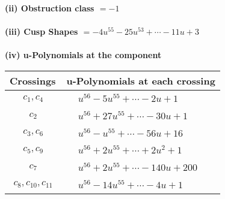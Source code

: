 \documentclass[1p]{elsarticle_modified}
\theoremstyle{definition}
\begin{document}
\flushleft \textbf{(ii) Obstruction class $= -1$}\\~\\
\flushleft \textbf{(iii) Cusp Shapes $= -4 u^{55}-25 u^{53}+\cdots-11 u+3$}\\~\\
\newpage\renewcommand{\arraystretch}{1}
\flushleft \textbf{(iv) u-Polynomials at the component}\newline \\
\begin{tabular}{m{50pt}|m{274pt}}
Crossings & \hspace{64pt}u-Polynomials at each crossing \\
\hline $$\begin{aligned}c_{1},c_{4}\end{aligned}$$&$\begin{aligned}
&u^{56}-5 u^{55}+\cdots-2 u+1
\end{aligned}$\\
\hline $$\begin{aligned}c_{2}\end{aligned}$$&$\begin{aligned}
&u^{56}+27 u^{55}+\cdots-30 u+1
\end{aligned}$\\
\hline $$\begin{aligned}c_{3},c_{6}\end{aligned}$$&$\begin{aligned}
&u^{56}- u^{55}+\cdots-56 u+16
\end{aligned}$\\
\hline $$\begin{aligned}c_{5},c_{9}\end{aligned}$$&$\begin{aligned}
&u^{56}+2 u^{55}+\cdots+2 u^2+1
\end{aligned}$\\
\hline $$\begin{aligned}c_{7}\end{aligned}$$&$\begin{aligned}
&u^{56}+2 u^{55}+\cdots-140 u+200
\end{aligned}$\\
\hline $$\begin{aligned}c_{8},c_{10},c_{11}\end{aligned}$$&$\begin{aligned}
&u^{56}-14 u^{55}+\cdots-4 u+1
\end{aligned}$\\
\hline
\end{tabular}\\~\\
\end{document}
